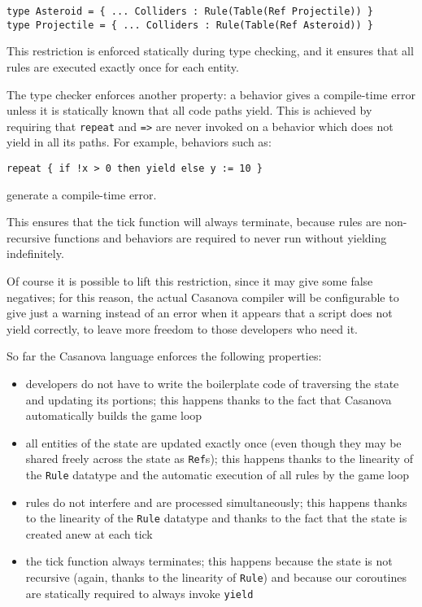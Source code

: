 \begin{lstlisting} 
type Asteroid = { ... Colliders : Rule(Table(Ref Projectile)) }
type Projectile = { ... Colliders : Rule(Table(Ref Asteroid)) }
\end{lstlisting} 

This restriction is enforced statically during type checking, and it ensures that all rules are executed exactly once for each entity.

The type checker enforces another property: a behavior gives a compile-time error unless it is statically known that all code paths yield. This is achieved by requiring that \texttt{repeat} and \texttt{=>} are never invoked on a behavior which does not yield in all its paths. For example, behaviors such as:

\begin{lstlisting} 
repeat { if !x > 0 then yield else y := 10 }
\end{lstlisting} 

generate a compile-time error.

This ensures that the tick function will always terminate, because rules are non-recursive functions and behaviors are required to never run without yielding indefinitely.


Of course it is possible to lift this restriction, since it may give some false negatives; for this reason, the actual Casanova compiler will be configurable to give just a warning instead of an error when it appears that a script does not yield correctly, to leave more freedom to those developers who need it.


So far the Casanova language enforces the following properties:
\begin{itemize}
\item developers do not have to write the boilerplate code of traversing the state and updating its portions; this happens thanks to the fact that Casanova automatically builds the game loop
\item all entities of the state are updated exactly once (even though they may be shared freely across the state as \texttt{Ref}s); this happens thanks to the linearity of the \texttt{Rule} datatype and the automatic execution of all rules by the game loop
\item rules do not interfere and are processed simultaneously; this happens thanks to the linearity of the \texttt{Rule} datatype and thanks to the fact that the state is created anew at each tick
\item the tick function always terminates; this happens because the state is not recursive (again, thanks to the linearity of \texttt{Rule}) and because our coroutines are statically required to always invoke \texttt{yield}
\end{itemize}

